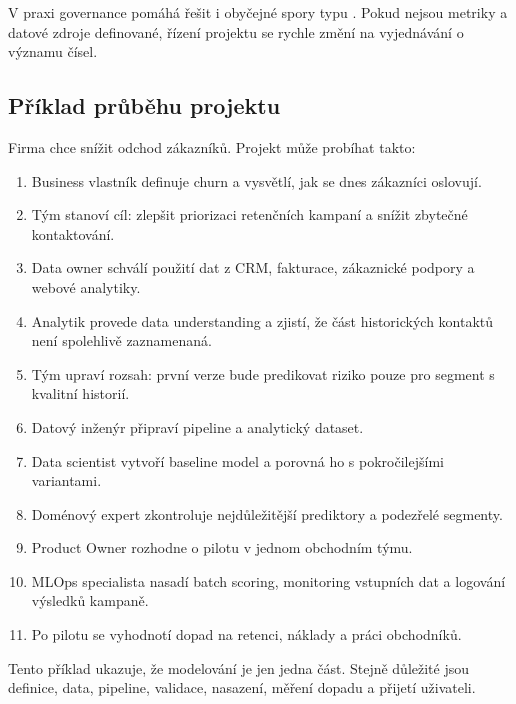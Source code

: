 V praxi governance pomáhá řešit i obyčejné spory typu . Pokud nejsou metriky a datové zdroje definované, řízení projektu se rychle změní na vyjednávání o významu čísel.

\subsection{Příklad průběhu projektu}
Firma chce snížit odchod zákazníků. Projekt může probíhat takto:
\begin{enumerate}
  \item Business vlastník definuje churn a vysvětlí, jak se dnes zákazníci oslovují.
  \item Tým stanoví cíl: zlepšit priorizaci retenčních kampaní a snížit zbytečné kontaktování.
  \item Data owner schválí použití dat z CRM, fakturace, zákaznické podpory a webové analytiky.
  \item Analytik provede data understanding a zjistí, že část historických kontaktů není spolehlivě zaznamenaná.
  \item Tým upraví rozsah: první verze bude predikovat riziko pouze pro segment s kvalitní historií.
  \item Datový inženýr připraví pipeline a analytický dataset.
  \item Data scientist vytvoří baseline model a porovná ho s pokročilejšími variantami.
  \item Doménový expert zkontroluje nejdůležitější prediktory a podezřelé segmenty.
  \item Product Owner rozhodne o pilotu v jednom obchodním týmu.
  \item MLOps specialista nasadí batch scoring, monitoring vstupních dat a logování výsledků kampaně.
  \item Po pilotu se vyhodnotí dopad na retenci, náklady a práci obchodníků.
\end{enumerate}

Tento příklad ukazuje, že modelování je jen jedna část. Stejně důležité jsou definice, data, pipeline, validace, nasazení, měření dopadu a přijetí uživateli.

